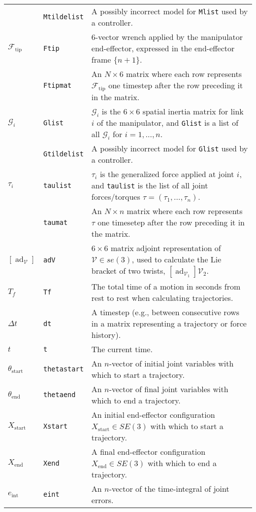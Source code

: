 \documentclass[11pt]{article}
\begin{document}
\begin{tabularx}{\linewidth}{llp{4.5in}}
& {\tt Mtildelist} & A possibly incorrect model for {\tt Mlist} used by a controller. \\
$\mathcal{F}_{\text{tip}}$ & {\tt Ftip} & $6$-vector wrench applied by the manipulator end-effector, expressed in the end-effector frame $\{n+1\}$. \\
& {\tt Ftipmat} & An $N \times 6$ matrix where each row represents $\mathcal{F}_{\text{tip}}$ one timestep after the row preceding it in the matrix. \\
$\mathcal{G}_i$ & {\tt Glist} & $\mathcal{G}_i$ is the $6\times 6$ spatial inertia matrix for link $i$ of the manipulator, and {\tt Glist} is a list of all $\mathcal{G}_i$ for $i = 1, \ldots, n$. \\
& {\tt Gtildelist} & A possibly incorrect model for {\tt Glist} used by a controller. \\
$\tau_i$ & {\tt taulist} & $\tau_i$ is the generalized force applied at joint $i$, and {\tt taulist} is the list of all joint forces/torques $\tau = (\tau_1, \ldots, \tau_n)$. \\
& {\tt taumat} & An $N \times n$ matrix where each row represents $\tau$ one timesetep after the row preceding it in the matrix. \\
$[\operatorname{ad}_{\mathcal{V}}]$ & {\tt adV} & $6 \times 6$ matrix adjoint representation of $\mathcal{V} \in se(3)$, used to calculate the Lie bracket of two twists, $[\operatorname{ad}_{\mathcal{V}_1}] \mathcal{V}_2$. \\
$T_f$ & {\tt Tf} & The total time of a motion in seconds from rest to rest when calculating trajectories. \\
$\Delta t$ & {\tt dt} & A timestep (e.g., between consecutive rows in a matrix representing a trajectory or force history). \\
$t$ & {\tt t} & The current time. \\
$\theta_{\text{start}}$ & {\tt thetastart} & An $n$-vector of initial joint variables with which to start a trajectory.\\
$\theta_{\text{end}}$ & {\tt thetaend} & An $n$-vector of final joint variables with which to end a trajectory.\\
$X_{\text{start}}$ & {\tt Xstart} & An initial end-effector configuration $X_{\text{start}} \in SE(3)$ with which to start a trajectory.\\
$X_{\text{end}}$ & {\tt Xend} & A final end-effector configuration $X_{\text{end}} \in SE(3)$ with which to end a trajectory.\\
$e_{\text{int}}$ & {\tt eint} & An $n$-vector of the time-integral of joint errors.\\

\end{tabularx}
\end{document}
